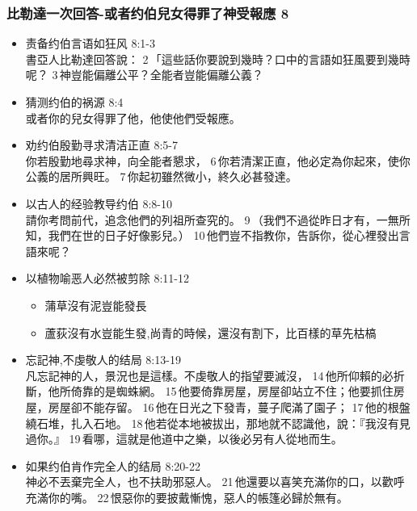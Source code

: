 \subsubsection{比勒達一次回答-或者约伯兒女得罪了神受報應 8}
\begin{itemize}
\itemsep-.45em  
\item 责备约伯言语如狂风 8:1-3\\
書亞人比勒達回答說： 2 「這些話你要說到幾時？口中的言語如狂風要到幾時呢？ 3 神豈能偏離公平？全能者豈能偏離公義？
\item 猜测约伯的祸源 8:4\\
或者你的兒女得罪了他，他使他們受報應。
\item 劝约伯殷勤寻求清洁正直 8:5-7\\
你若殷勤地尋求神，向全能者懇求， 6 你若清潔正直，他必定為你起來，使你公義的居所興旺。 7 你起初雖然微小，終久必甚發達。
\item 以古人的经验教导约伯 8:8-10\\
請你考問前代，追念他們的列祖所查究的。 9 （我們不過從昨日才有，一無所知，我們在世的日子好像影兒。） 10 他們豈不指教你，告訴你，從心裡發出言語來呢？
\item 以植物喻恶人必然被剪除 8:11-12
\begin{itemize}
\itemsep-.45em  
\item 蒲草沒有泥豈能發長
\item 蘆荻沒有水豈能生發,尚青的時候，還沒有割下，比百樣的草先枯槁
\end{itemize}
\item 忘記神,不虔敬人的结局 8:13-19\\
凡忘記神的人，景況也是這樣。不虔敬人的指望要滅沒， 14 他所仰賴的必折斷，他所倚靠的是蜘蛛網。 15 他要倚靠房屋，房屋卻站立不住；他要抓住房屋，房屋卻不能存留。 16 他在日光之下發青，蔓子爬滿了園子； 17 他的根盤繞石堆，扎入石地。 18 他若從本地被拔出，那地就不認識他，說：『我沒有見過你。』 19 看哪，這就是他道中之樂，以後必另有人從地而生。
\item 如果约伯肯作完全人的结局 8:20-22\\
神必不丟棄完全人，也不扶助邪惡人。 21 他還要以喜笑充滿你的口，以歡呼充滿你的嘴。 22 恨惡你的要披戴慚愧，惡人的帳篷必歸於無有。
\end{itemize}


